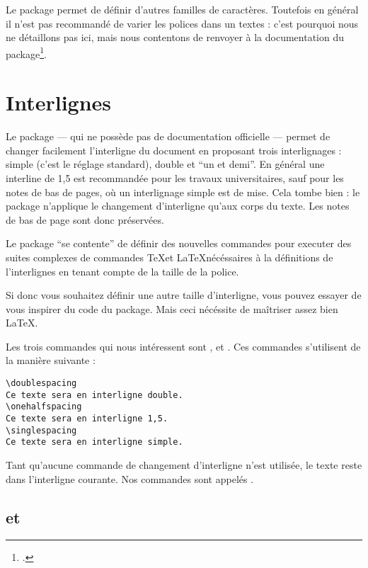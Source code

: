\begin{anedocte}
Le package  permet de définir d'autres familles de caractères. Toutefois en général il n'est pas recommandé de varier les polices dans un textes : c'est pourquoi nous ne détaillons pas ici, mais nous contentons de renvoyer à la documentation du package\footcite{fontspec_nouvellefamille}.
\end{anedocte}

\section{Interlignes}

Le package  --- qui ne possède pas de documentation officielle --- permet de changer facilement l'interligne du document en proposant trois interlignages : simple (c'est le réglage standard), double et \enquote{un et demi}. En général une interline de 1,5 est recommandée pour les travaux universitaires, sauf pour les notes de bas de pages, où un interlignage simple est de mise. Cela tombe bien : le package n'applique le changement d'interligne qu'aux corps du texte. Les notes de bas de page sont donc préservées.

\begin{anedocte}
Le package   \enquote{se contente} de définir des nouvelles commandes pour executer des suites complexes de commandes \TeX et \LaTeX nécéssaires à la définitions de l'interlignes en tenant compte de la taille de la police.

Si donc vous souhaitez définir une autre taille d'interligne, vous pouvez essayer de vous inspirer du code du package. Mais ceci nécéssite de maîtriser assez bien \LaTeX. 
\end{anedocte}

Les trois commandes qui nous intéressent sont ,  et . Ces commandes s'utilisent de la manière suivante :

\begin{verbatim}
\doublespacing
Ce texte sera en interligne double.
\onehalfspacing
Ce texte sera en interligne 1,5.
\singlespacing
Ce texte sera en interligne simple. 
\end{verbatim}

Tant qu'aucune commande de changement d'interligne n'est utilisée, le texte reste dans l'interligne courante. Nos commandes sont appelés .

\subsection{ et }\label{bascule}

